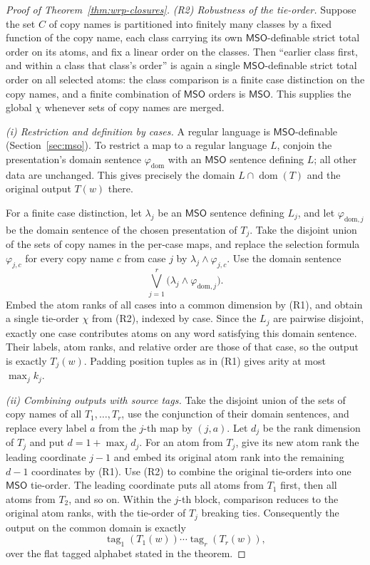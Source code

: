 \documentclass[11pt]{article}
\theoremstyle{definition}
\newcommand{\MSO}{\mathsf{MSO}}
\begin{document}
\begin{proof}[Proof of Theorem~\ref{thm:wrp-closures}]
\vspace{0.5em}
\noindent\emph{(R2) Robustness of the tie-order.}
Suppose the set $C$ of copy names is partitioned into finitely many classes by
a fixed function of the copy name, each class carrying its own $\MSO$-definable
strict total order on its atoms, and fix a linear order on the classes.  Then
``earlier class first, and within a class that class's order'' is again a single
$\MSO$-definable strict total order on all selected atoms: the class comparison
is a finite case distinction on the copy names, and a finite combination of
$\MSO$ orders is $\MSO$.  This supplies the global $\chi$ whenever sets of copy
names are merged.

\vspace{0.5em}
\noindent\emph{(i) Restriction and definition by cases.}
A regular language is $\MSO$-definable (Section~\ref{sec:mso}).  To restrict a
map to a regular language $L$, conjoin the presentation's domain sentence
$\varphi_{\mathrm{dom}}$ with an $\MSO$ sentence defining $L$; all other data
are unchanged.  This gives precisely the domain
$L\cap\operatorname{dom}(T)$ and the original output $T(w)$ there.

For a finite case distinction, let $\lambda_j$ be an $\MSO$ sentence defining
$L_j$, and let $\varphi_{\mathrm{dom},j}$ be the domain sentence of the chosen
presentation of $T_j$.  Take the disjoint union of the sets of copy names in the
per-case maps, and replace the selection formula $\varphi_{j,c}$ for every copy
name $c$ from case $j$ by $\lambda_j\wedge\varphi_{j,c}$.  Use the domain sentence
\[
   \bigvee_{j=1}^r
   \bigl(\lambda_j\wedge\varphi_{\mathrm{dom},j}\bigr).
\]
Embed the atom ranks of all cases into a common dimension by (R1), and obtain a
single tie-order $\chi$ from (R2), indexed by case.  Since the $L_j$ are pairwise
disjoint, exactly one case contributes atoms on any word satisfying this
domain sentence.
Their labels, atom ranks, and relative order are those of that case, so the
output is exactly $T_j(w)$.  Padding position tuples as in (R1) gives arity at
most $\max_j k_j$.

\vspace{0.5em}
\noindent\emph{(ii) Combining outputs with source tags.}
Take the disjoint union of the sets of copy names of all $T_1,\ldots,T_r$, use
the conjunction of their domain sentences, and replace every label $a$ from the
$j$-th map by $(j,a)$.  Let $d_j$ be the rank dimension of $T_j$ and put
$d=1+\max_j d_j$.  For an atom from $T_j$, give its new atom rank the leading
coordinate $j-1$ and embed its original atom rank into the remaining $d-1$
coordinates by (R1).  Use (R2) to combine the original tie-orders into one
$\MSO$ tie-order.  The leading coordinate puts all atoms from $T_1$ first,
then all atoms from $T_2$, and so on.  Within the $j$-th block, comparison
reduces to the original atom ranks, with the tie-order of $T_j$ breaking ties.
Consequently the output
on the common domain is exactly
\[
   \operatorname{tag}_1(T_1(w))\cdots
   \operatorname{tag}_r(T_r(w)),
\]
over the flat tagged alphabet stated in the theorem.


\end{proof}
\end{document}
